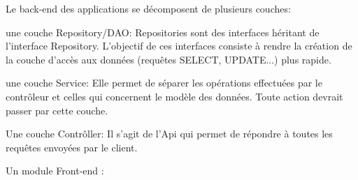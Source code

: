 \documentclass[a4paper]{article}
\begin{document}
Le back-end des applications se décomposent de plusieurs couches: 


une couche Repository/DAO: Repositories sont des interfaces héritant de l'interface Repository. L'objectif de ces interfaces consiste à rendre la création de la couche d'accès aux données (requêtes SELECT, UPDATE...) plus rapide.

une couche Service: Elle permet de séparer les opérations effectuées par le contrôleur et celles qui concernent le modèle des données. Toute action devrait passer par cette couche.

Une couche Contrôller: Il s'agit de l'Api qui permet de répondre à toutes les requêtes envoyées par le client. 

Un module Front-end :
\end{document}
